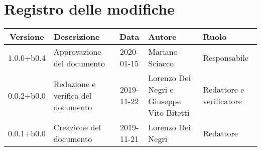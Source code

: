 \section*{Registro delle modifiche}

\begin{center}
	\begin{longtable}{|c|p{3.5cm}|c|p{3cm}|p{3cm}|}
		\hline
		\rowcolor{lighter-grayer}
		\textbf{Versione} & \textbf{Descrizione} & \textbf{Data} & \textbf{Autore} & \textbf{Ruolo} \\
		\hline
		\endfirsthead


	1.0.0+b0.4 & Approvazione del documento & 2020-01-15 & Mariano Sciacco & Responsabile \\
	\hline
	0.0.2+b0.0 & Redazione e verifica del documento & 2019-11-22 & Lorenzo Dei Negri e Giuseppe Vito Bitetti & Redattore e verificatore \\
	\hline
	0.0.1+b0.0 & Creazione del documento & 2019-11-21 & Lorenzo Dei Negri & Redattore \\

	\hline

	\end{longtable}
\end{center}
